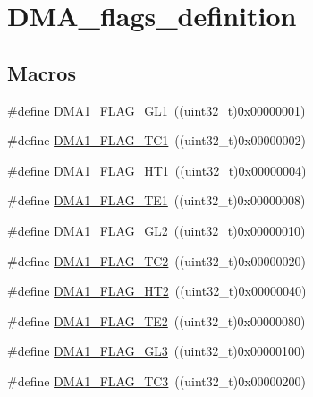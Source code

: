 \hypertarget{group___d_m_a__flags__definition}{}\section{D\+M\+A\+\_\+flags\+\_\+definition}
\label{group___d_m_a__flags__definition}
\subsection*{Macros}
\begin{DoxyCompactItemize}
\item 
\#define \mbox{\hyperlink{group___d_m_a__flags__definition_gad1ac00f031065682ac125f6f9be061e6}{D\+M\+A1\+\_\+\+F\+L\+A\+G\+\_\+\+G\+L1}}~((uint32\+\_\+t)0x00000001)
\item 
\#define \mbox{\hyperlink{group___d_m_a__flags__definition_gaa9b4d1112bcfd34136007b813a11187e}{D\+M\+A1\+\_\+\+F\+L\+A\+G\+\_\+\+T\+C1}}~((uint32\+\_\+t)0x00000002)
\item 
\#define \mbox{\hyperlink{group___d_m_a__flags__definition_ga9c806b96cfdcebddb64f70d13ad32270}{D\+M\+A1\+\_\+\+F\+L\+A\+G\+\_\+\+H\+T1}}~((uint32\+\_\+t)0x00000004)
\item 
\#define \mbox{\hyperlink{group___d_m_a__flags__definition_gae30157801ac1460dab86a8f54cfd3479}{D\+M\+A1\+\_\+\+F\+L\+A\+G\+\_\+\+T\+E1}}~((uint32\+\_\+t)0x00000008)
\item 
\#define \mbox{\hyperlink{group___d_m_a__flags__definition_gad27b8a0cf554638d78fb67a010c0419b}{D\+M\+A1\+\_\+\+F\+L\+A\+G\+\_\+\+G\+L2}}~((uint32\+\_\+t)0x00000010)
\item 
\#define \mbox{\hyperlink{group___d_m_a__flags__definition_ga0eff24f7e6b2b874328d531ee9315b20}{D\+M\+A1\+\_\+\+F\+L\+A\+G\+\_\+\+T\+C2}}~((uint32\+\_\+t)0x00000020)
\item 
\#define \mbox{\hyperlink{group___d_m_a__flags__definition_gae154ffd90ebaec11f9ed1be00e69f149}{D\+M\+A1\+\_\+\+F\+L\+A\+G\+\_\+\+H\+T2}}~((uint32\+\_\+t)0x00000040)
\item 
\#define \mbox{\hyperlink{group___d_m_a__flags__definition_ga23bfb917d32a8dd5a96d343ef5f6ea46}{D\+M\+A1\+\_\+\+F\+L\+A\+G\+\_\+\+T\+E2}}~((uint32\+\_\+t)0x00000080)
\item 
\#define \mbox{\hyperlink{group___d_m_a__flags__definition_gaf3eccffb15e5b64611774b22f8b43e91}{D\+M\+A1\+\_\+\+F\+L\+A\+G\+\_\+\+G\+L3}}~((uint32\+\_\+t)0x00000100)
\item 
\#define \mbox{\hyperlink{group___d_m_a__flags__definition_ga0490d6c6fca12f4bcc61ef69e3fbdd93}{D\+M\+A1\+\_\+\+F\+L\+A\+G\+\_\+\+T\+C3}}~((uint32\+\_\+t)0x00000200)

\end{DoxyCompactItemize}
